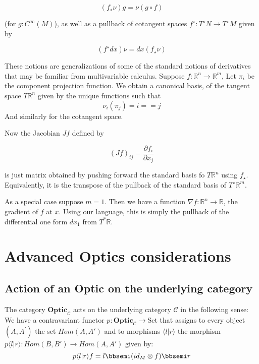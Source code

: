 \documentclass[letterpaper, 10 pt, conference]{ieeeconf}  %
\newcommand{\Optic}{\textbf{Optic}}
\newcommand{\R}{\mathbb{R}}
\begin{document}
\begin{equation}
(f_\star \nu) g = \nu(g \circ f)
\end{equation}

(for $g: C^\infty(M)$), as well as a pullback of cotangent spaces $f^\star: T^\star N \to T^\star M$
given by

\begin{equation}
(f^\star dx) \nu = dx(f_\star \nu)
\end{equation}

These notions are generalizations of some of the standard notions of derivatives
that may be familiar from multivariable calculus. Suppose $f: \R^n \to \R^m$,
Let $\pi_i$ be the component projection function. We obtain a canonical basis,
of the tangent space $T \R^n$ given by the unique functions such that
\begin{equation}
\nu_i (\pi_j) = i == j
\end{equation}
And similarly for the cotangent space.

Now the Jacobian $J f$ defined by

\begin{equation}
(J f)_{ij} = \frac{\partial f_i}{\partial x_j}
\end{equation}

is just matrix obtained by pushing forward the standard basis fo $T \R^n$ using
$f_\star$. Equivalently, it is the transpose of the pullback of the standard
basis of $T^\star \R^m$.

As a special case suppose $m=1$. Then we have a function $\nabla f: \R^n \to \R$,
the gradient of $f$ at $x$. Using our language, this is simply the pullback of
the differential one form $dx_1$ from $T^* \R$.

\section{Advanced Optics considerations}

\subsection{Action of an Optic on the underlying category}

The category $\Optic_\mathcal{C}$ acts on the underlying category $\mathcal{C}$
in the following sense: We have a contravariant functor $p: \Optic_\mathcal{C} \to \text{Set}$
that assigns to every object $(A, A^\prime)$ the set $Hom(A, A\prime)$ and to
morphisms $\langle l | r \rangle$ the morphism $p \langle l | r \rangle: Hom(B, B\prime) \to Hom(A, A\prime)$
given by:
\[
p \langle l | r \rangle f = l \bbsemi (id_M \otimes f) \bbsemi r
\]
\end{document}
